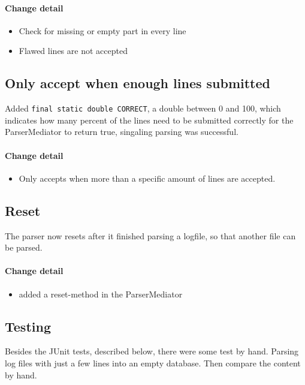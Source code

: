 \paragraph{Change detail}
\begin{itemize}
  \item Check for missing or empty part in every line
  \item Flawed lines are not accepted
\end{itemize}

\subsection{Only accept when enough lines submitted}
Added \texttt{final static double CORRECT}, a double between 0 and 100, which indicates how many percent of the lines need to be
submitted correctly for the ParserMediator to return true, singaling parsing was successful.

\paragraph{Change detail}
\begin{itemize}
  \item Only accepts when more than a specific amount of lines are accepted.
\end{itemize}

\subsection{Reset}
The parser now resets after it finished parsing a logfile, so that another file can be parsed.

\paragraph{Change detail}
\begin{itemize}
  \item added a reset-method in the ParserMediator
\end{itemize}


\subsection{Testing}

Besides the JUnit tests, described below, there were some test by hand. Parsing log files with
just a few lines into an empty database. Then compare the content by hand.

